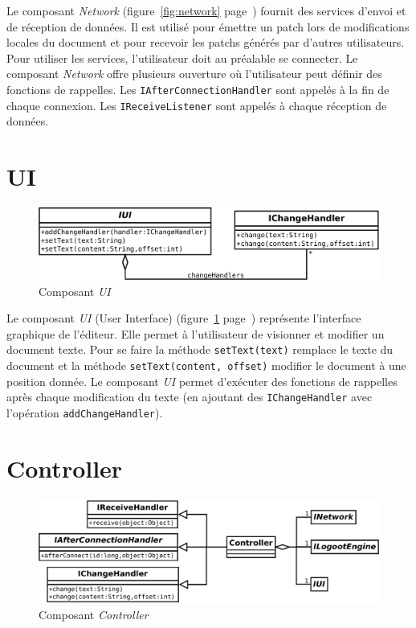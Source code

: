   Le composant \emph{Network} (figure~\ref{fig:network}
  page~\pageref{fig:network}) fournit des services d'envoi et de réception de
  données. Il est utilisé pour émettre un patch lors de modifications locales
  du document et pour recevoir les patchs générés par d'autres utilisateurs.
  Pour utiliser les services, l'utilisateur doit au préalable se connecter.
  Le composant \emph{Network} offre plusieurs ouverture où l'utilisateur peut
  définir des fonctions de rappelles. Les \verb?IAfterConnectionHandler? sont
  appelés à la fin de chaque connexion. Les \verb?IReceiveListener? sont appelés
  à chaque réception de données.

  \section{UI}
  \begin{figure}[hbt]
    \center
    \includegraphics[width=.9\textwidth]{includes/model/IUI.pdf}
    \caption{Composant \emph{UI}}
    \label{fig:ui}
  \end{figure}

  Le composant \emph{UI} (User Interface) (figure~\ref{fig:ui}
  page~\pageref{fig:ui}) représente l'interface
  graphique de l'éditeur. Elle permet à l'utilisateur de visionner et modifier
  un document texte. Pour se faire la méthode \verb?setText(text)? remplace le 
  texte du document et la méthode \verb?setText(content, offset)?
  modifier le document à une position donnée. Le composant \emph{UI} permet
  d'exécuter des fonctions de rappelles après chaque modification du texte (en
  ajoutant des \verb?IChangeHandler? avec l'opération \verb?addChangeHandler?).

  \section{Controller}
  \begin{figure}[hbt]
    \center
    \includegraphics[width=.9\textwidth]{includes/model/Controller.pdf}
    \caption{Composant \emph{Controller}}
    \label{fig:controller}
  \end{figure}

